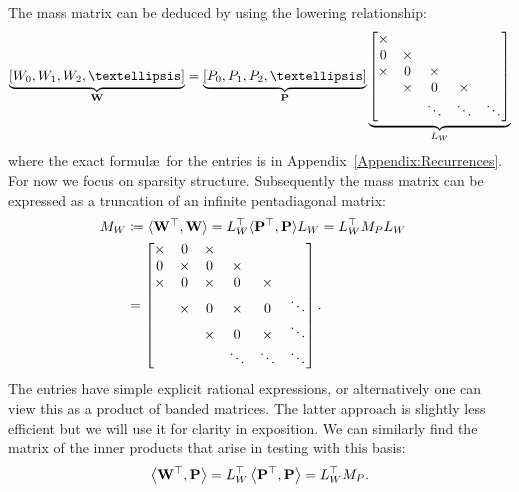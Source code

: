 \documentclass[hidelinks,onefignum,onetabnum]{siamart220329}
\def\bfP{{\bf P}}
\def\bfW{{\bf W}}
\def\ip<#1>{\left\langle{#1}\right\rangle}
\def\appref#1{Appendix~\ref{Appendix:#1}}
\begin{document}
The mass matrix can be deduced by using the lowering relationship:
\begin{align}
\underbrace{[W_0,W_1,W_2,\ensuremath{\ldots}]}_\bfW = \underbrace{[P_0,P_1,P_2,\ensuremath{\ldots}]}_\bfP \underbrace{\begin{bmatrix} \times  \\ 0 & \times \\ \times & 0 & \times \\ &\times &0 & \times \\ &&\ensuremath{\ddots} & \ensuremath{\ddots} & \ensuremath{\ddots} 
\end{bmatrix}}_{L_W}
\label{rec:lowering}
\end{align}
where the exact formul\ae\ for the entries is in \appref{Recurrences}. For now we focus on sparsity structure. Subsequently the mass matrix can be expressed as a truncation of an infinite pentadiagonal matrix:
 \begin{align*}
	M_W &\coloneqq
\ensuremath{\langle}\bfW^\ensuremath{\top}, \bfW\ensuremath{\rangle} = L_W^\ensuremath{\top}\ensuremath{\langle}\bfP^\ensuremath{\top}, \bfP\ensuremath{\rangle} L_W = L_W^\ensuremath{\top} M_P L_W \cr
&= \begin{bmatrix}
\times & 0 & \times \\
0 & \times & 0 & \times  \\
\times & 0 & \times & 0 & \times  \\
 & \times & 0 & \times & 0 & \ddots  \\
  && \times & 0 & \times & \ddots  \\
 & &  & \ddots & \ddots & \ddots
 \end{bmatrix}.
\end{align*}
The entries have simple explicit rational expressions, or alternatively one can view this as a product of banded matrices. The latter approach is slightly less efficient but we will use it for clarity in exposition. We can similarly find the matrix of the inner products that arise in testing with this basis:
\[
\ip<\bfW^\top, \bfP>  = L_W^\top  \ip<\bfP^\top, \bfP>    = L_W^\top M_P.
\]
\end{document}

